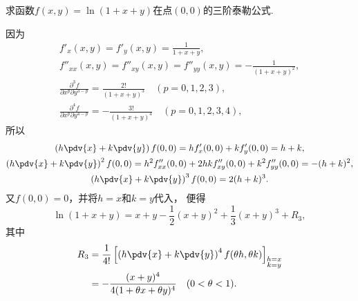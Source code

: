 \begin{example}
求函数\(f(x,y) = \ln(1+x+y)\)在点\((0,0)\)的三阶泰勒公式.
\begin{solution}
\def\oprt#1{\left(h\pdv{x}+k\pdv{y}\right)\ifx\relax#1\relax\else^{#1}\fi}
因为\begin{gather*}
	f'_x(x,y) = f'_y(x,y) = \frac{1}{1+x+y}, \\
	f''_{xx}(x,y) = f''_{xy}(x,y) = f''_{yy}(x,y) = -\frac{1}{(1+x+y)^2}, \\
	\frac{\partial^3 f}{\partial x^p \partial y^{3-p}}
	= \frac{2!}{(1+x+y)^3}
	\quad(p=0,1,2,3), \\
	\frac{\partial^4 f}{\partial x^p \partial y^{4-p}}
	= -\frac{3!}{(1+x+y)^4}
	\quad(p=0,1,2,3,4),
\end{gather*}
所以\begin{gather*}
	\oprt{} f(0,0)
	= h f'_x(0,0) + k f'_y(0,0)
	= h+k, \\
	\oprt{2} f(0,0)
	= h^2 f''_{xx}(0,0) + 2hk f''_{xy}(0,0) + k^2 f''_{yy}(0,0)
	= -(h+k)^2, \\
	\oprt{3} f(0,0)
	= 2(h+k)^3.
\end{gather*}
又\(f(0,0) = 0\)，并将\(h=x\)和\(k=y\)代入，
便得\begin{equation*}
	\ln(1+x+y) = x+y-\frac{1}{2}(x+y)^2+\frac{1}{3}(x+y)^3+R_3,
\end{equation*}
其中\begin{align*}
	R_3
	&= \frac{1}{4!} \left[\oprt{4} f(\theta h,\theta k)\right]_{\substack{h=x\\k=y}} \\
	&= -\frac{(x+y)^4}{4(1+\theta x+\theta y)^4}
	\quad(0<\theta<1).
\end{align*}
\end{solution}
\end{example}

